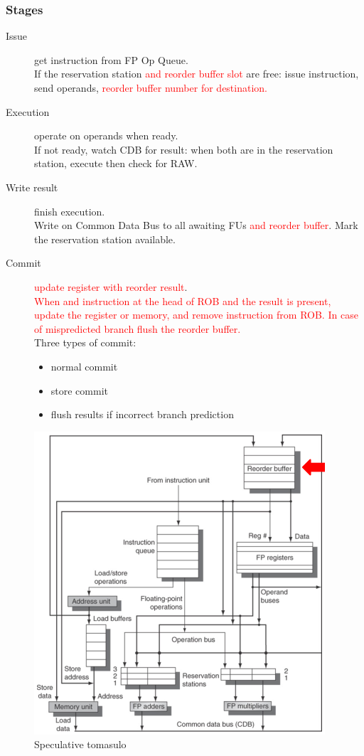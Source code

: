 \subsubsection{Stages}
\begin{description}
    \item[Issue] get instruction from FP Op Queue.\\
    If the reservation station \textcolor{red}{and reorder buffer slot} are free: issue instruction, send
    operands, \textcolor{red}{reorder buffer number for destination.}
    \item[Execution] operate on operands when ready.\\
    If not ready, watch CDB for result: when both are in the reservation station, execute then check for RAW\@.
    \item[Write result] finish execution.\\
    Write on Common Data Bus to all awaiting FUs \textcolor{red}{and reorder buffer}.
    Mark the reservation station available.
    \item[Commit] \textcolor{red}{update register with reorder result}.\\
    \textcolor{red}{When and instruction at the head of ROB and the result is present, update the register or memory,
        and remove instruction from ROB. In case of mispredicted branch flush the reorder buffer.}\\
    Three types of commit:
    \begin{itemize}[noitemsep]
        \item normal commit
        \item store commit
        \item flush results if incorrect branch prediction
    \end{itemize}
\end{description}

\begin{figure}
    \centering
    \includegraphics[scale = 0.5]{images/speculative-tomasulo}
    \caption{Speculative tomasulo}
    \label{fig:speculative-tomasulo}
\end{figure}

